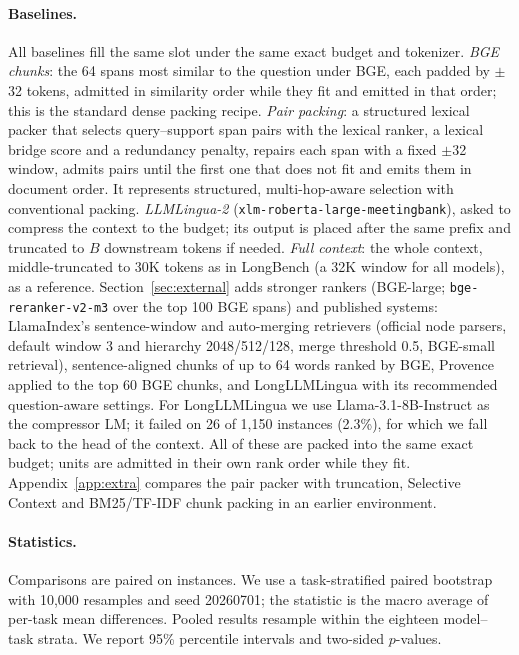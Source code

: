 \documentclass[11pt]{article}
\begin{document}
\paragraph{Baselines.} All baselines fill the same slot under the same exact budget and tokenizer.
\emph{BGE chunks}: the 64 spans most similar to the question under BGE, each padded by $\pm$32 tokens, admitted in similarity order while they fit and emitted in that order; this is the standard dense packing recipe.
\emph{Pair packing}: a structured lexical packer that selects query--support span pairs with the lexical ranker, a lexical bridge score and a redundancy penalty, repairs each span with a fixed $\pm$32 window, admits pairs until the first one that does not fit and emits them in document order. It represents structured, multi-hop-aware selection with conventional packing.
\emph{LLMLingua-2} \citep{pan2024llmlingua2} (\texttt{xlm-roberta-large-meetingbank}), asked to compress the context to the budget; its output is placed after the same prefix and truncated to $B$ downstream tokens if needed.
\emph{Full context}: the whole context, middle-truncated to 30K tokens as in LongBench (a 32K window for all models), as a reference.
Section~\ref{sec:external} adds stronger rankers (BGE-large; \texttt{bge-reranker-v2-m3} over the top 100 BGE spans) and published systems: LlamaIndex's sentence-window and auto-merging retrievers \citep{liu2022llamaindex} (official node parsers, default window 3 and hierarchy 2048/512/128, merge threshold 0.5, BGE-small retrieval), sentence-aligned chunks of up to 64 words ranked by BGE, Provence \citep{chirkova2025provence} applied to the top 60 BGE chunks, and LongLLMLingua \citep{jiang2024longllmlingua} with its recommended question-aware settings. For LongLLMLingua we use Llama-3.1-8B-Instruct as the compressor LM; it failed on 26 of 1,150 instances (2.3\%), for which we fall back to the head of the context. All of these are packed into the same exact budget; units are admitted in their own rank order while they fit.
Appendix~\ref{app:extra} compares the pair packer with truncation, Selective Context and BM25/TF-IDF chunk packing in an earlier environment.

\paragraph{Statistics.} Comparisons are paired on instances. We use a task-stratified paired bootstrap \citep{efron1993bootstrap} with 10,000 resamples and seed 20260701; the statistic is the macro average of per-task mean differences. Pooled results resample within the eighteen model--task strata. We report 95\% percentile intervals and two-sided $p$-values.
\end{document}
